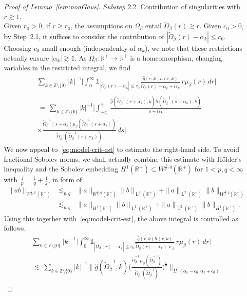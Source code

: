 \documentclass[a4paper,11pt,reqno,noindent]{amsart}
\theoremstyle{plain}
\numberwithin{equation}{section}
\newcommand{\e}{\varepsilon}
\newcommand{\R}{\mathbb R}
\newcommand{\Z}{\mathbb Z}
\newcommand{\3}{|\!|\!|}
\newcommand{\Ld}{\operatorname{L}}
\newcommand{\substep}[1]{\noindent \textit{Substep} #1.}
\begin{document}
\begin{proof}[Proof of Lemma~\ref{lem:nonGaus}]
{\medskip
\substep{2.2} Contribution of singularities with $r\gtrsim1$.\\
Given $r_0>0$, if $r\ge r_0$, the assumptions on $\Omega_\beta$ entail $\tilde\Omega_\beta(r)\gtrsim r$.
Given $c_0>0$, by Step~2.1, it suffices to consider the contribution of $|\tilde\Omega_\beta(r)-\alpha_k|\le c_0$. Choosing $c_0$ small enough (independently of $\alpha_k$), we note that these restrictions actually ensure $|\alpha_k|\gtrsim1$.
As $\tilde\Omega_\beta:\R^+\to\R^+$ is a homeomorphism, changing variables in the restricted integral, we find
\begin{multline*}
\sum_{k\in\Z\setminus\{0\}}|k|^{-1}\bigg|\int_0^\infty\mathds1_{|\tilde\Omega_\beta(r)-\alpha_k|\le c_0}\frac{\overline{\hat g(r,k)}\hat h(r,k)}{\tilde\Omega_\beta(r)-\alpha_k+i\e_k}\,r\mu_\beta(r)\,dr\bigg|\\
\,=\,\sum_{k\in\Z\setminus\{0\}}|k|^{-1}\bigg|\int_{-c_0}^{c_0}\frac{\overline{\hat g(\tilde\Omega_\beta^{-1}(s+\alpha_k),k)}\hat h(\tilde\Omega_\beta^{-1}(s+\alpha_k),k)}{s+i\e_k}\\[-2mm]
\times\frac{\tilde\Omega_\beta^{-1}(s+\alpha_k)\mu_\beta(\tilde\Omega_\beta^{-1}(s+\alpha_k))}{\tilde\Omega_\beta'(\tilde\Omega_\beta^{-1}(s+\alpha_k))}\,ds\bigg|.
\end{multline*}
We now appeal to~\eqref{eq:model-crit-est} to estimate the right-hand side.
To avoid fractional Sobolev norms, we shall actually combine this estimate with H\"older's inequality and the Sobolev embedding $H^1(\R^+)\subset W^{\frac1p,q}(\R^+)$ for $1<p,q<\infty$ with~$\frac1p=\frac1q+\frac12$, in form of
\begin{eqnarray}
\|ab\|_{W^{\frac1p,p}(\R^+)}&\lesssim_{p,q}&\|a\|_{W^{\frac1p,q}(\R^+)}\|b\|_{\Ld^2(\R^+)}+\|a\|_{\Ld^2(\R^+)}\|b\|_{W^{\frac1p,q}(\R^+)}\nonumber\\
&\lesssim_{p,q}&\|a\|_{H^1(\R^+)}\|b\|_{\Ld^2(\R^+)}+\|a\|_{\Ld^2(\R^+)}\|b\|_{H^1(\R^+)}.\label{eq:estim-prod-sob}
\end{eqnarray}
Using this together with~\eqref{eq:model-crit-est}, the above integral is controlled as follows,
\begin{multline*}
\sum_{k\in\Z\setminus\{0\}}|k|^{-1}\bigg|\int_0^\infty\mathds1_{|\tilde\Omega_\beta(r)-\alpha_k|\le c_0}\frac{\overline{\hat g(r,k)}\hat h(r,k)}{\tilde\Omega_\beta(r)-\alpha_k+i\e_k}\,r\mu_\beta(r)\,dr\bigg|\\
\,\lesssim\,\sum_{k\in\Z\setminus\{0\}}|k|^{-1}\bigg\|\hat g(\tilde\Omega_\beta^{-1},k)\Big(\frac{\tilde\Omega_\beta^{-1}\mu_\beta(\tilde\Omega_\beta^{-1})}{\tilde\Omega_\beta'(\tilde\Omega_\beta^{-1})}\Big)^\frac12\bigg\|_{H^1(\alpha_k-c_0,\alpha_k+c_0)}\\

\end{multline*}}
\end{proof}
\end{document}
